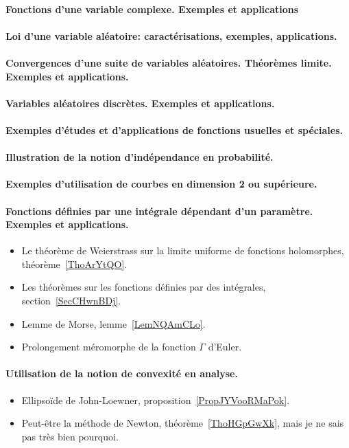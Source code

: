 \paragraph{Fonctions d'une variable complexe. Exemples et applications}
\paragraph{Loi d'une variable aléatoire: caractérisations, exemples, applications.}
\paragraph{Convergences d'une suite de variables aléatoires. Théorèmes limite. Exemples et applications.}
\paragraph{Variables aléatoires discrètes. Exemples et applications.}
\paragraph{Exemples d'études et d'applications de fonctions usuelles et spéciales.}
\paragraph{Illustration de la notion d'indépendance en probabilité.}
\paragraph{Exemples d'utilisation de courbes en dimension 2 ou supérieure.}


\paragraph{Fonctions définies par une intégrale dépendant d’un paramètre. Exemples et applications.}
\begin{itemize}
    \item Le théorème de Weierstrass sur la limite uniforme de fonctions holomorphes, théorème~\ref{ThoArYtQO}.
    \item Les théorèmes sur les fonctions définies par des intégrales, section~\ref{SecCHwnBDj}.
    \item Lemme de Morse, lemme~\ref{LemNQAmCLo}.
    \item Prolongement méromorphe de la fonction \( \Gamma\) d'Euler.
\end{itemize}
\paragraph{Utilisation de la notion de convexité en analyse.}
\begin{itemize}
    \item Ellipsoïde de John-Loewner, proposition~\ref{PropJYVooRMaPok}.
    \item Peut-être la méthode de Newton, théorème~\ref{ThoHGpGwXk}, mais je ne sais pas très bien pourquoi.
\end{itemize}

